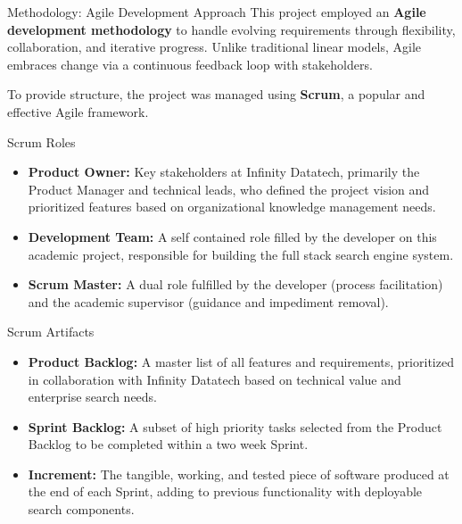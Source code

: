 \begin{frame}{Methodology: Agile Development Approach}
This project employed an \textbf{Agile development methodology} to handle evolving requirements through flexibility, collaboration, and iterative progress. Unlike traditional linear models, Agile embraces change via a continuous feedback loop with stakeholders.

To provide structure, the project was managed using \textbf{Scrum}, a popular and effective Agile framework.
\end{frame}

\begin{frame}{Scrum Roles}
\begin{itemize}
\item \textbf{Product Owner:} Key stakeholders at Infinity Datatech, primarily the Product Manager and technical leads, who defined the project vision and prioritized features based on organizational knowledge management needs.
\item \textbf{Development Team:} A self contained role filled by the developer on this academic project, responsible for building the full stack search engine system.
\item \textbf{Scrum Master:} A dual role fulfilled by the developer (process facilitation) and the academic supervisor (guidance and impediment removal).
\end{itemize}
\end{frame}

\begin{frame}{Scrum Artifacts}
\begin{itemize}
\item \textbf{Product Backlog:} A master list of all features and requirements, prioritized in collaboration with Infinity Datatech based on technical value and enterprise search needs.
\item \textbf{Sprint Backlog:} A subset of high priority tasks selected from the Product Backlog to be completed within a two week Sprint.
\item \textbf{Increment:} The tangible, working, and tested piece of software produced at the end of each Sprint, adding to previous functionality with deployable search components.
\end{itemize}
\end{frame}


